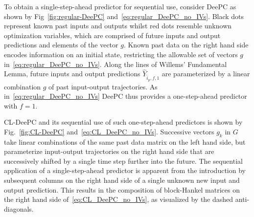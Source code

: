 To obtain a single-step-ahead predictor for sequential use, consider \ac{DeePC} as shown by Fig~\ref{fig:regular-DeePC} and~\eqref{eq:regular_DeePC_no_IVs}. Black dots represent known past inputs and outputs whilst red dots resemble unknown optimization variables, which are comprised of future inputs and output predictions and elements of the vector $g$. Known past data on the right hand side encodes information on an initial state, restricting the allowable set of vectors $g$ in~\eqref{eq:regular_DeePC_no_IVs}. Along the lines of Willems' Fundamental Lemma, future inputs and output predictions $\widehat{Y}_{\hat{i}_p,f,1}$ are parameterized by a linear combination $g$ of past input-output trajectories. As in~\eqref{eq:regular_DeePC_no_IVs} \ac{DeePC} thus provides a one-step-ahead predictor with $f=1$.

\ac{CL-DeePC} and its sequential use of such one-step-ahead predictors is shown by Fig.~\ref{fig:CL-DeePC} and~\eqref{eq:CL_DeePC_no_IVs}. Successive vectors $g_k$ in $G$ take linear combinations of the same past data matrix on the left hand side, but parameterize input-output trajectories on the right hand side that are successively shifted by a single time step further into the future. The sequential application of a single-step-ahead predictor is apparent from the introduction by subsequent columns on the right hand side of a single unknown new input and output prediction. This results in the composition of block-Hankel matrices on the right hand side of~\eqref{eq:CL_DeePC_no_IVs}, as visualized by the dashed anti-diagonals.
%
